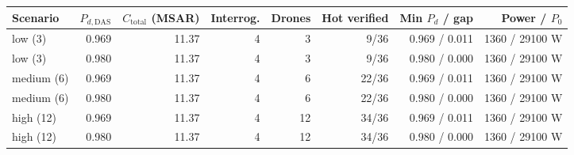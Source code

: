 \begin{tabular}{lrrrrrrr}
\hline
Scenario & $P_{d,\mathrm{DAS}}$ & $C_{\mathrm{total}}$ (MSAR) & Interrog. & Drones & Hot verified & Min $P_d$ / gap & Power / $P_0$ \\
\hline
low (3) & 0.969 & 11.37 & 4 & 3 & 9/36 & 0.969 / 0.011 & 1360 / 29100 W \\
low (3) & 0.980 & 11.37 & 4 & 3 & 9/36 & 0.980 / 0.000 & 1360 / 29100 W \\
medium (6) & 0.969 & 11.37 & 4 & 6 & 22/36 & 0.969 / 0.011 & 1360 / 29100 W \\
medium (6) & 0.980 & 11.37 & 4 & 6 & 22/36 & 0.980 / 0.000 & 1360 / 29100 W \\
high (12) & 0.969 & 11.37 & 4 & 12 & 34/36 & 0.969 / 0.011 & 1360 / 29100 W \\
high (12) & 0.980 & 11.37 & 4 & 12 & 34/36 & 0.980 / 0.000 & 1360 / 29100 W \\
\hline
\end{tabular}
